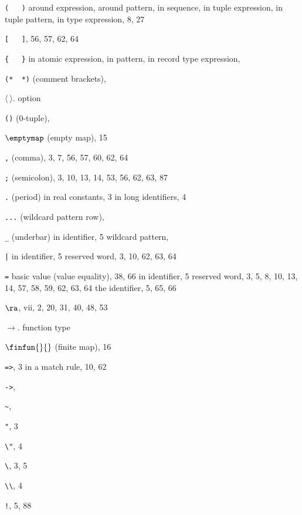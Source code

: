 \begin{theindex}
\item \verb+(   )+
\subitem around expression, \parexprefs
\subitem around pattern, \parpatrefs
\subitem in sequence,  \sequenceexprefs
\subitem in tuple expression, \tupleexprefs
\subitem in tuple pattern, \tuplepatrefs
\subitem in type expression, 8, 27
\item \verb+[   ]+, 56, 57, 62, 64
\item \verb+{   }+
\subitem in atomic expression, \recordexprefs
\subitem in pattern, \recordpatrefs
\subitem in record type expression, \bracestyexprefs
\item \verb+(*  *)+ (comment brackets), \commentrefs
\item $\langle\ \rangle$. \see option
\item \verb+()+ (0-tuple), \zerotuplerefs
\item $\emptymap$ (empty map), 15
\item \verb+,+ (comma), 3, 7, 56, 57, 60, 62, 64
\item \verb+;+ (semicolon), 3, 10, 13, 14, 53, 56, 62, 63, 87
\item \verb+.+ (period)
\subitem in real constants, 3
\subitem in long identifiers, 4
\item \verb+...+ (wildcard pattern row), \dotdotdotrefs
\item \verb+_+ (underbar)
\subitem in identifier, 5
\subitem wildcard pattern, \underscorewildrefs
\item \verb+|+
\subitem in identifier, 5
\subitem reserved word, 3, 10, 62, 63, 64
\item \verb+=+
\subitem basic value (value equality), 38, 66
\subitem in identifier, 5
\subitem reserved word, 3, 5, 8, 10, 13, 14, 57, 58, 59, 62, 63, 64
\subitem the identifier, 5, 65, 66
\item $\ra$, vii, 2, 20, 31, 40, 48, 53
\item $\rightarrow$. \see function type
\item $\finfun{}{}$ (finite map), 16
\item \verb+=>+, 3
\subitem in a match rule, 10, 62
\item \verb+->+, \funtyperefs
\item \verb+~+, \unaryminusrefs
\item \verb+"+, 3
\item \verb+\"+, 4
\item \verb+\+, 3, 5
\item \verb+\\+, 4
\item \verb+!+, 5, 88

\end{theindex}
